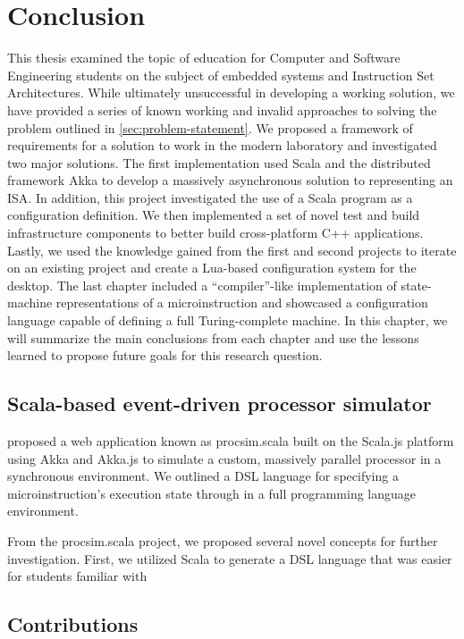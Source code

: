 \chapter{Conclusion}
\label{ch:conclusion}

This thesis examined the topic of education for Computer and Software Engineering students on the subject of embedded systems and Instruction Set Architectures. While ultimately unsuccessful in developing a working solution, we have provided a series of known working and invalid approaches to solving the problem outlined in \cref{sec:problem-statement}. We proposed a framework of requirements for a solution to work in the modern laboratory and investigated two major solutions. The first implementation used Scala and the distributed framework Akka to develop a massively asynchronous solution to representing an ISA. In addition, this project investigated the use of a Scala program as a configuration definition. We then implemented a set of novel test and build infrastructure components to better build cross-platform C++ applications. Lastly, we used the knowledge gained from the first and second projects to iterate on an existing project and create a Lua-based configuration system for the desktop. The last chapter included a ``compiler''-like implementation of state-machine representations of a microinstruction and showcased a configuration language capable of defining a full Turing-complete machine. In this chapter, we will summarize the main conclusions from each chapter and use the lessons learned to propose future goals for this research question. 

\section{Scala-based event-driven processor simulator}

 proposed a web application known as procsim.scala built on the Scala.js platform using Akka and Akka.js to simulate a custom, massively parallel processor in a synchronous environment. We outlined a DSL language for specifying a microinstruction's execution state through in a full programming language environment.

From the procsim.scala project, we proposed several novel concepts for further investigation. First, we utilized Scala to generate a DSL language that was easier for students familiar with 

\section{Contributions}

